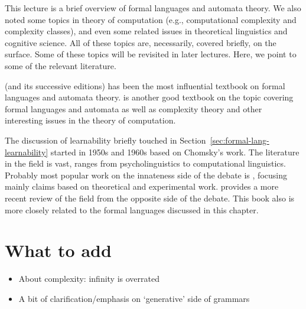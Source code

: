 This lecture is a brief overview of formal languages
and automata theory.
We also noted some topics in theory of computation
(e.g., computational complexity and complexity classes),
and even some related issues in theoretical linguistics
and cognitive science.
All of these topics are, necessarily, covered briefly, on the surface.
Some of these topics will be revisited in later lectures.
Here, we point to some of the relevant literature.

\textcite{hopcroft1979} (and its successive editions) has been
the most influential textbook on formal languages and automata theory.
\textcite{sipser2006} is another good textbook
on the topic
covering formal languages and automata as well as 
complexity theory and other interesting issues in the theory of computation.

The discussion of learnability
briefly touched in Section~\ref{sec:formal-lang-learnability}
started in 1950s and 1960s based on Chomsky's work.
The literature in the field is vast,
ranges from psycholinguistics to computational linguistics.
Probably most popular work
on the innateness side of the debate is \textcite{pinker1994},
focusing mainly claims based on theoretical and experimental work.
\textcite{a.clark2011book} provides a more recent review of the field
from the opposite side of the debate.
This book also is more closely related
to the formal languages discussed in this chapter.

\section{What to add}

\begin{itemize}
  \item About complexity: infinity is overrated
  \item A bit of clarification/emphasis on `generative' side of grammars
\end{itemize}
